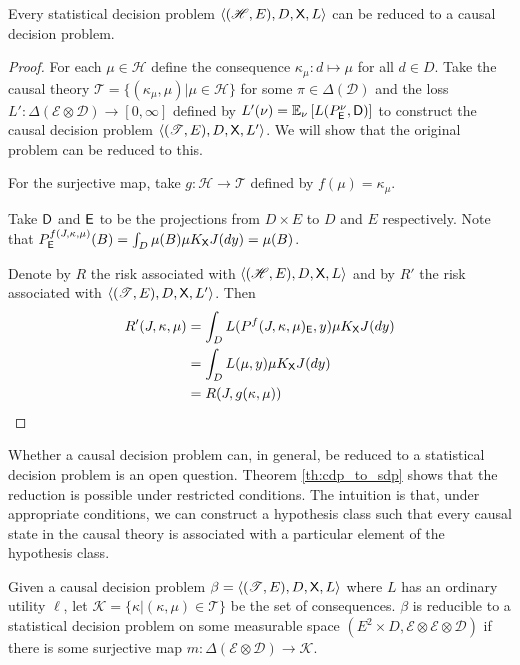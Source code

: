 \begin{theorem}
Every statistical decision problem $\langle (\mathscr{H},E),D,\mathsf{X},L\rangle$ can be reduced to a causal decision problem.
\end{theorem}
\begin{proof}
For each $\mu\in \mathscr{H}$ define the consequence $\kappa_\mu:d\mapsto \mu$ for all $d\in D$. Take the causal theory $\mathscr{T}=\{(\kappa_\mu,\mu)|\mu\in \mathscr{H}\}$ for some $\pi\in \Delta(\mathcal{D})$ and the loss $L':\Delta(\mathcal{E}\otimes\mathcal{D})\to[0,\infty]$ defined by $L'(\nu) = \mathbb{E}_\nu \left[L(P^\nu_{\mathsf{E}},\mathsf{D})\right]$ to construct the causal decision problem $\langle (\mathscr{T},E),D,\mathsf{X},L'\rangle$. We will show that the original problem can be reduced to this.

For the surjective map, take $g:\mathscr{H}\to \mathscr{T}$ defined by $f(\mu)=\kappa_\mu$.

Take $\mathsf{D}$ and $\mathsf{E}$ to be the projections from $D\times E$ to $D$ and $E$ respectively. Note that $P^{f(J,\kappa,\mu)}_{\mathsf{E}}(B) = \int_D \mu(B) \mu K_{\mathsf{X}} J(dy) = \mu(B)$.

Denote by $R$ the risk associated with $\langle (\mathscr{H},E),D,\mathsf{X},L\rangle$ and by $R'$ the risk associated with $\langle (\mathscr{T},E),D,\mathsf{X},L'\rangle$. Then
\begin{align}
    R'(J,\kappa,\mu) &= \int_D L(P^f(J,\kappa,\mu)_{\mathsf{E}}, y) \mu K_{\mathsf{X}} J(dy)\\
                   &= \int_D L(\mu,y) \mu K_{\mathsf{X}} J(dy)\\
                   &=R(J,g(\kappa,\mu))
\end{align}
\end{proof}

Whether a causal decision problem can, in general, be reduced to a statistical decision problem is an open question. Theorem \ref{th:cdp_to_sdp} shows that the reduction is possible under restricted conditions. The intuition is that, under appropriate conditions, we can construct a hypothesis class such that every causal state in the causal theory is associated with a particular element of the hypothesis class.

\begin{lemma}\label{lem:red_cdp}
Given a causal decision problem $\beta=\langle (\mathscr{T},E),D,\mathsf{X},L\rangle$ where $L$ has an ordinary utility $\ell$, let $\mathscr{K}=\{\kappa|(\kappa,\mu)\in \mathscr{T}\}$ be the set of consequences. $\beta$ is reducible to a statistical decision problem on some measurable space $(E^2\times D,\mathcal{E}\otimes \mathcal{E}\otimes \mathcal{D})$ if there is some surjective map $m:\Delta(\mathcal{E}\otimes\mathcal{D})\to \mathscr{K}$.
\end{lemma}


